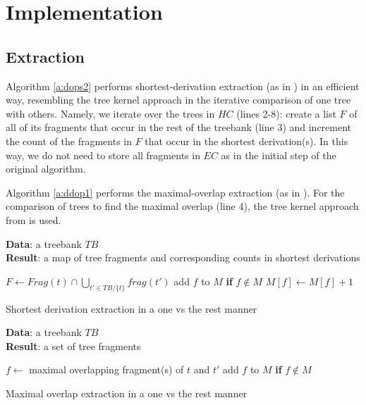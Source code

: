 \section{Implementation}

\subsection{Extraction}
Algorithm \ref{a:dops2} performs shortest-derivation extraction (as in \dops{}) in an efficient way, resembling the tree kernel approach in the iterative comparison of one tree with others. Namely, we iterate over the trees in $HC$ (lines 2-8): create a list $F$ of all of its fragments that occur in the rest of the treebank (line 3) and increment the count of the fragments in $F$ that occur in the shortest derivation(s). In this way, we do not need to store all fragments in $EC$ as in the initial step of the original \dops{} algorithm. 

Algorithm \ref{a:ddop1} performs the maximal-overlap extraction (as in \ddop{}). For the comparison of trees to find the maximal overlap (line 4), the tree kernel approach from \cite{sangati2011} is used. 

\begin{algorithm}
{\bf Data}: a treebank $TB$\\
{\bf Result}: a map of tree fragments and corresponding counts in shortest derivations\\
\begin{algorithmic}[1]
	\State $F \gets Frag(t)\cap \bigcup\limits_{t'\in TB/\{t\}} frag(t')$
		\State add $f$ to $M$ {\bf if} $f\not\in M$
		\State $M[f]\gets M[f]+1$ 
	\EndFor
\EndFor
\end{algorithmic}
\caption{Shortest derivation extraction in a one vs the rest manner}
\label{a:dops2}
\end{algorithm}


\begin{algorithm}
{\bf Data}: a treebank $TB$\\
{\bf Result}: a set of tree fragments\\
\begin{algorithmic}[1]
		\State $f\gets$ maximal overlapping fragment(s) of $t$ and $t'$
		\State add $f$ to $M$ {\bf if} $f\not\in M$
	\EndFor
\EndFor
\end{algorithmic}



\caption{Maximal overlap extraction in a one vs the rest manner}
\label{a:ddop1}
\end{algorithm}

